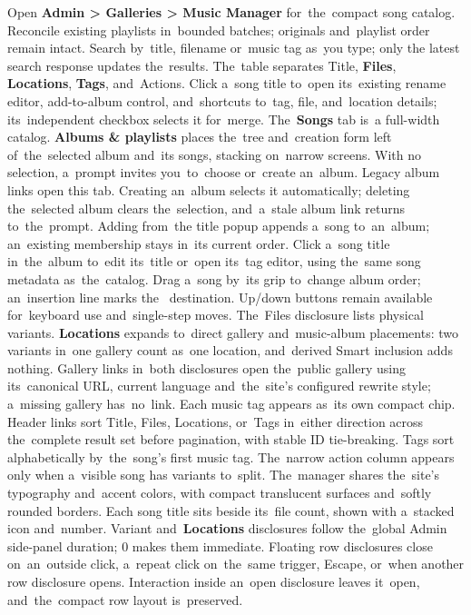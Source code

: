 \documentclass[11pt,a4paper]{article}
\newcommand{\ui}[1]{\textbf{#1}}
\begin{document}
Open \ui{Admin > Galleries > Music Manager} for~the~compact song catalog.
Reconcile existing playlists in~bounded batches; originals and~playlist order
remain intact. Search by~title, filename or~music tag as~you type; only the
latest search response updates the~results. The~table separates Title,
\ui{Files},
\ui{Locations}, \ui{Tags}, and~Actions. Click a~song title to~open its~existing
rename editor, add-to-album control, and~shortcuts to~tag, file, and~location
details; its~independent checkbox selects it for~merge. The~\ui{Songs} tab is~a
full-width catalog. \ui{Albums \& playlists} places the~tree and~creation form
left of~the~selected album and~its songs, stacking on~narrow screens. With no
selection, a~prompt invites you~to~choose or~create an~album. Legacy album links
open this tab. Creating an~album selects it automatically; deleting the~selected
album clears the~selection, and~a~stale album link returns to~the~prompt. Adding
from~the title popup appends a~song to~an~album; an~existing
membership stays in~its current order. Click a~song title in~the~album to~edit
its~title or~open its~tag editor, using the~same song metadata as~the~catalog.
Drag a~song by~its grip to~change album order; an~insertion line marks the~
destination. Up/down buttons remain available
for~keyboard use and~single-step moves. The~Files
disclosure lists physical variants. \ui{Locations} expands to~direct gallery
and~music-album placements: two variants in~one gallery count as~one location,
and~derived Smart inclusion adds nothing. Gallery links in~both disclosures
open the~public gallery using its~canonical URL, current language and~the~site's
configured rewrite style; a~missing gallery has~no~link. Each music tag appears
as~its own compact chip.
Header links sort Title, Files, Locations, or~Tags in~either direction across
the~complete result set before pagination, with stable ID tie-breaking. Tags
sort alphabetically by~the~song's first music tag.
The~narrow action column appears only when a~visible song has variants to~split.
The~manager shares the~site's typography and~accent colors, with compact
translucent surfaces and~softly rounded borders. Each song title sits beside
its~file count, shown with a~stacked icon and~number. Variant and~\ui{Locations}
disclosures follow the~global Admin side-panel duration; 0 makes them immediate.
Floating row disclosures close on~an~outside click, a~repeat click on~the~same
trigger, Escape, or~when another row disclosure opens. Interaction inside
an~open
disclosure leaves it~open, and~the~compact row layout is~preserved.
\end{document}
